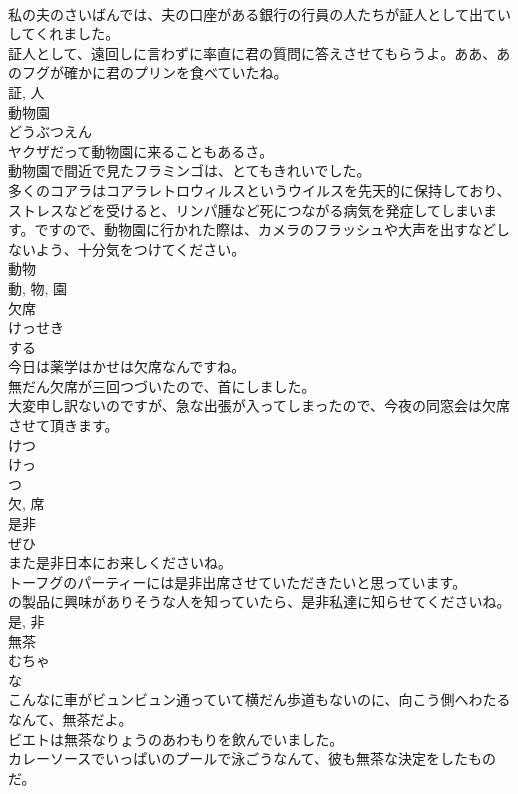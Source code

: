 \documentclass[8pt]{extreport}
\begin{document}
\begin{CJK}{UTF8}{min}
\\	私の夫のさいばんでは、夫の口座がある銀行の行員の人たちが証人として出ていしてくれました。	
\\	証人として、遠回しに言わずに率直に君の質問に答えさせてもらうよ。ああ、あのフグが確かに君のプリンを食べていたね。	
\\	証, 人	
\\	動物園	
\\	どうぶつえん	
\\	ヤクザだって動物園に来ることもあるさ。	
\\	動物園で間近で見たフラミンゴは、とてもきれいでした。	
\\	多くのコアラはコアラレトロウィルスというウイルスを先天的に保持しており、ストレスなどを受けると、リンパ腫など死につながる病気を発症してしまいます。ですので、動物園に行かれた際は、カメラのフラッシュや大声を出すなどしないよう、十分気をつけてください。	
\\	動物 
\\	動, 物, 園	
\\	欠席	
\\	けっせき	
\\	する 
\\	今日は薬学はかせは欠席なんですね。	
\\	無だん欠席が三回つづいたので、首にしました。	
\\	大変申し訳ないのですが、急な出張が入ってしまったので、今夜の同窓会は欠席させて頂きます。	
\\	けつ 
\\	けっ 
\\	つ
\\	欠, 席	
\\	是非	
\\	ぜひ	
\\	また是非日本にお来しくださいね。	
\\	トーフグのパーティーには是非出席させていただきたいと思っています。	
\\	の製品に興味がありそうな人を知っていたら、是非私達に知らせてくださいね。	
\\	是, 非	
\\	無茶	
\\	むちゃ	
\\	な 
\\	こんなに車がビュンビュン通っていて横だん歩道もないのに、向こう側へわたるなんて、無茶だよ。	
\\	ビエトは無茶なりょうのあわもりを飲んでいました。	
\\	カレーソースでいっぱいのプールで泳ごうなんて、彼も無茶な決定をしたものだ。	

\end{CJK}
\end{document}
